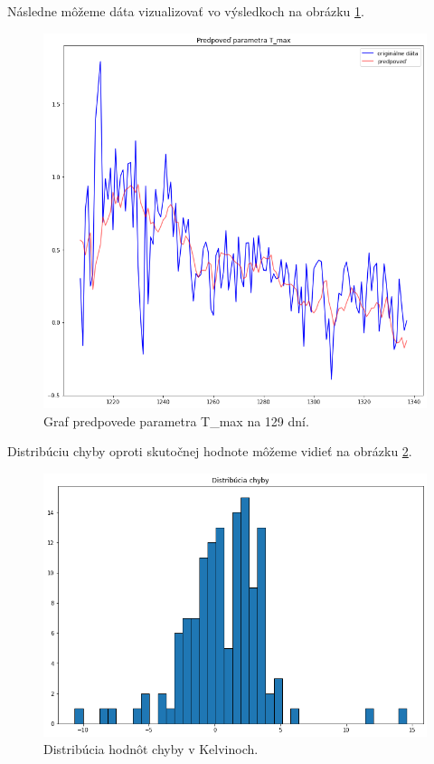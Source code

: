 \newline
Následne môžeme dáta vizualizovať vo výsledkoch na obrázku \ref{predpoved}.
\begin{figure}[!htbp]
  \centering
  \includegraphics[width=14cm]{img/predpoved_T_max.png}
  \caption{Graf predpovede parametra T\_max na 129 dní.}
  \label{predpoved}
\end{figure}

\newline
Distribúciu chyby oproti skutočnej hodnote môžeme vidieť na obrázku \ref{dist_error}.
\begin{figure}[!htbp]
  \centering
  \includegraphics[width=14cm]{img/distro_chyby.png}
  \caption{Distribúcia hodnôt chyby v Kelvinoch.}
  \label{dist_error}
\end{figure}

